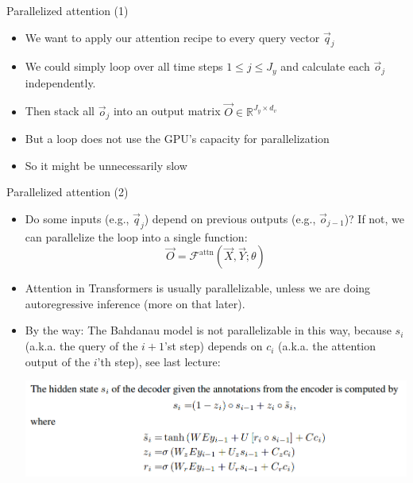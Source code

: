 
\begin{vbframe}{Parallelized attention (1)}

\vfill

\begin{itemize}
	\item We want to apply our attention recipe to every query vector $\vec q_j$
	\item We could simply loop over all time steps $1 \leq j \leq J_y$ and calculate each $\vec o_j$ independently.
	\item Then stack all $\vec o_j$ into an output matrix $\vec O \in \mathbb{R}^{J_y \times d_v}$
	\item But a loop does not use the GPU's capacity for parallelization
	\item So it might be unnecessarily slow
\end{itemize}

\vfill

\end{vbframe}


\begin{vbframe}{Parallelized attention (2)}

\vfill

\begin{itemize}
\item Do some inputs (e.g., $\vec q_j$) depend on previous outputs (e.g., $\vec o_{j-1}$)? If not, we can parallelize the loop into a single function:
$$\vec O = \mathcal{F}^\mathrm{attn}(\vec X, \vec Y; \theta)$$
\item Attention in Transformers is usually parallelizable, unless we are doing autoregressive inference (more on that later).
\item By the way: The Bahdanau model is not parallelizable in this way, because $s_i$ (a.k.a. the query of the $i+1$'st step) depends on $c_i$ (a.k.a. the attention output of the $i$'th step), see last lecture:
\begin{center}
\includegraphics[width=.9\textwidth]{figure/bahdanau3}
\end{center}
\end{itemize}

\vfill

\end{vbframe}

